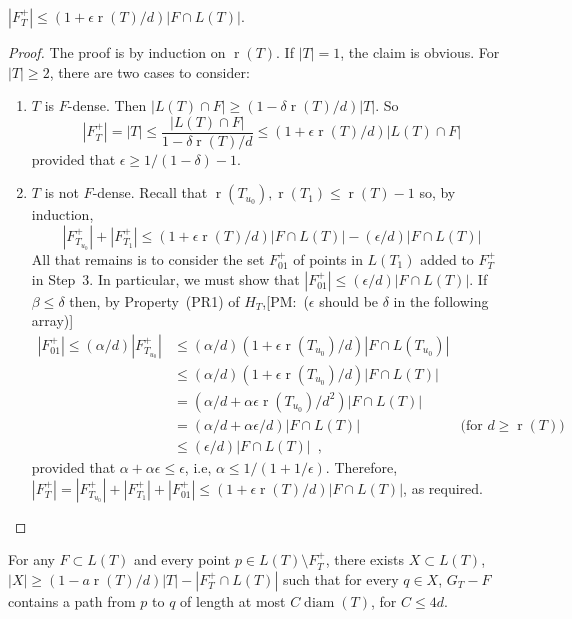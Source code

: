 \documentclass{patmorin}
\newcommand{\note}[2]{{\color{red}[#1:~#2]}}
\DeclareMathOperator{\rank}{r}
\DeclareMathOperator{\diam}{diam}
\begin{document}
\begin{clm}
	$|F^+_T| \le (1+\epsilon\rank(T)/d)|F\cap L(T)|$.
\end{clm}

\begin{proof}
  The proof is by induction on $\rank(T)$. If $|T|=1$, the claim is
  obvious. For $|T|\ge 2$, there are two cases to consider:
  \begin{enumerate}
    \item $T$ is $F$-dense. Then  $|L(T)\cap F|\ge
    (1-\delta\rank(T)/d)|T|$.  So
     \[
       |F^+_T|=|T|
	  \le \frac{|L(T)\cap F|}{1-\delta\rank(T)/d} 
          \le (1+\epsilon\rank(T)/d)|L(T)\cap F|
     \]
     provided that $\epsilon \ge 1/(1-\delta)-1$.

    \item $T$ is not $F$-dense. Recall that
    $\rank(T_{u_0}),\rank(T_1)\le\rank(T)-1$ so, by induction,
     \[
        |F^+_{T_{u_0}}|	+ |F^+_{T_{1}}| 
          \le (1+\epsilon\rank(T)/d)|F\cap L(T)| - (\epsilon/d)|F\cap L(T)|
     \]
     All that remains is to consider the set $F^+_{01}$ of points in 
     $L(T_1)$ added to $F^+_T$ in Step~3.  In particular, we must show that
     $|F^+_{01}|\le (\epsilon/d)|F\cap L(T)|$. If $\beta \le \delta$ then, 
     by Property~(PR1) of $H_T$,\note{PM}{($\epsilon$ should be $\delta$ in the following array)}
     \begin{align*}
      |F^+_{01}| \le (\alpha/d)|F^+_{T_{u_0}}|
        & \le (\alpha/d)(1+\epsilon\rank(T_{u_0})/d)|F\cap L(T_{u_0})| \\
        & \le (\alpha/d)(1+\epsilon\rank(T_{u_0})/d)|F\cap L(T)|\\
        & = (\alpha/d+\alpha\epsilon\rank(T_{u_0})/d^2)|F\cap L(T)| \\
        & = (\alpha/d+\alpha\epsilon/d)|F\cap L(T)| 
	     & \text{(for $d\ge \rank(T)$)} \\
	& \le (\epsilon/d)|F\cap L(T)| \enspace ,
   \end{align*}
   provided that $\alpha+\alpha\epsilon \le \epsilon$, i.e, 
   $\alpha \le 1/(1+1/\epsilon)$. Therefore, 
   $|F^+_T| = |F^+_{T_{u_0}}| + |F^+_{T_1}| + |F^+_{01}| \le (1+\epsilon\rank(T)/d)|F\cap L(T)|$, as required. \qedhere
   \end{enumerate}
\end{proof}


\begin{clm}
  For any $F\subset L(T)$ and every point $p\in L(T)\setminus F^+_T$,
  there exists $X\subset L(T)$, $|X|\ge (1-a\rank(T)/d)|T|-|F^+_T\cap
  L(T)|$ such that for every $q\in X$, $G_T-F$ contains a path from $p$
  to $q$ of length at most $C\diam(T)$, for $C\le 4d$.
\end{clm}
\end{document}
